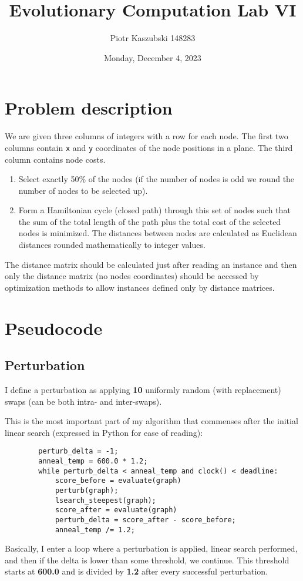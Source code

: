 \documentclass[14pt]{article}
\title{Evolutionary Computation Lab VI}
\author{Piotr Kaszubski 148283}
\date{Monday, December  4, 2023}
\begin{document}
\maketitle
\tableofcontents
\newpage

\section{Problem description}
We are given three columns of integers with a row for each node. The first two
columns contain \verb`x` and \verb`y` coordinates of the node positions in a
plane. The third column contains node costs.

\begin{enumerate}
	\item Select exactly 50\% of the nodes (if the number of nodes is odd we
		round the number of nodes to be selected up).
	\item Form a Hamiltonian cycle (closed path) through this set of nodes such
		that the sum of the total length of the path plus the total cost of the
		selected nodes is minimized. The distances between nodes are calculated
		as Euclidean distances rounded mathematically to integer values.
\end{enumerate}

The distance matrix should be calculated just after reading an instance and
then only the distance matrix (no nodes coordinates) should be accessed by
optimization methods to allow instances defined only by distance matrices.

\section{Pseudocode}
\subsection{Perturbation}
I define a perturbation as applying \textbf{10} uniformly random (with
replacement) swaps (can be both intra- and inter-swaps).

This is the most important part of my algorithm that commenses after the
initial linear search (expressed in Python for ease of reading):
\begin{listing}[H]
	\begin{verbatim}
		perturb_delta = -1;
		anneal_temp = 600.0 * 1.2;
		while perturb_delta < anneal_temp and clock() < deadline:
			score_before = evaluate(graph)
			perturb(graph);
			lsearch_steepest(graph);
			score_after = evaluate(graph)
			perturb_delta = score_after - score_before;
			anneal_temp /= 1.2;
	\end{verbatim}
\end{listing}
\vspace{-1cm}
Basically, I enter a loop where a perturbation is applied, linear search
performed, and then if the delta is lower than some threshold, we continue.
This threshold starts at \textbf{600.0} and is divided by \textbf{1.2} after
every successful perturbation.
\end{document}
